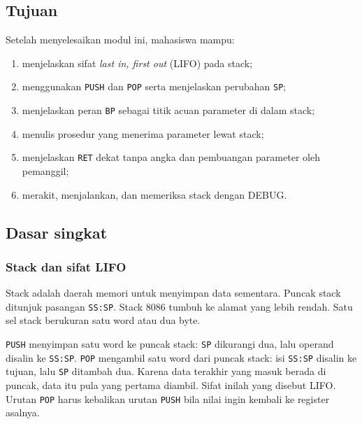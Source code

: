 
\subsection{Tujuan}

\begin{tujuan}
Setelah menyelesaikan modul ini, mahasiswa mampu:
\begin{enumerate}
    \item menjelaskan sifat \emph{last in, first out} (LIFO) pada
          stack;
    \item menggunakan \texttt{PUSH} dan \texttt{POP} serta menjelaskan
          perubahan \texttt{SP};
    \item menjelaskan peran \texttt{BP} sebagai titik acuan parameter
          di dalam stack;
    \item menulis prosedur yang menerima parameter lewat stack;
    \item menjelaskan \texttt{RET} dekat tanpa angka dan pembuangan
          parameter oleh pemanggil;
    \item merakit, menjalankan, dan memeriksa stack dengan DEBUG.
\end{enumerate}
\end{tujuan}

\subsection{Dasar singkat}

\subsubsection*{Stack dan sifat LIFO}

Stack adalah daerah memori untuk menyimpan data sementara. Puncak
stack ditunjuk pasangan \texttt{SS:SP}. Stack 8086 tumbuh ke alamat
yang lebih rendah. Satu sel stack berukuran satu word atau dua byte.

\texttt{PUSH} menyimpan satu word ke puncak stack: \texttt{SP}
dikurangi dua, lalu operand disalin ke \texttt{SS:SP}. \texttt{POP}
mengambil satu word dari puncak stack: isi \texttt{SS:SP} disalin ke
tujuan, lalu \texttt{SP} ditambah dua. Karena data terakhir yang
masuk berada di puncak, data itu pula yang pertama diambil. Sifat
inilah yang disebut LIFO. Urutan \texttt{POP} harus kebalikan urutan
\texttt{PUSH} bila nilai ingin kembali ke register asalnya.

